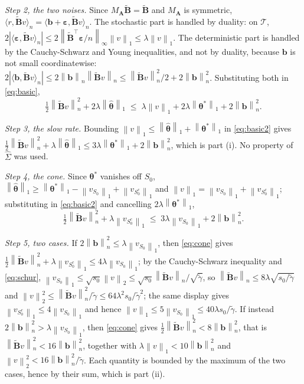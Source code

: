 \documentclass[10pt]{book}
\theoremstyle{definition}
\newcommand{\T}{^{\top}}
\newcommand{\norm}[1]{\left\lVert #1 \right\rVert}
\newcommand{\normn}[1]{\left\lVert #1 \right\rVert_{n}}
\newcommand{\inner}[2]{\langle #1, #2 \rangle}
\newcommand{\btheta}{\boldsymbol{\theta}}
\newcommand{\thetastar}{\btheta^{*}}
\newcommand{\thetahat}{\widehat{\btheta}}
\newcommand{\Gramhat}{\widehat{\Sigma}}
\newcommand{\pen}{\lambda}
\newcommand{\Szero}{S_{0}}
\newcommand{\Amat}{\mathbf{A}}
\newcommand{\Bmat}{\mathbf{B}}
\newcommand{\Btil}{\widetilde{\Bmat}}
\newcommand{\MA}{M_{\Amat}}
\newcommand{\bveps}{\boldsymbol{\varepsilon}}
\newcommand{\bb}{\mathbf{b}}
\newcommand{\gtil}{\widetilde{\gamma}}
\begin{document}
\emph{Step 2, the two noises.} Since $\MA\Btil = \Btil$ and $\MA$ is
symmetric, $\inner{r}{\Btil v}_n = \inner{\bb+\bveps}{\Btil v}_n$. The
stochastic part is handled by duality: on $\mathcal{T}$,
$2|\inner{\bveps}{\Btil v}_n| \le
2\norm{\Btil\T\bveps/n}_{\infty}\norm{v}_1 \le \pen\norm{v}_1$. The
deterministic part is handled by the Cauchy-Schwarz and Young inequalities,
and not by duality, because $\bb$ is not small coordinatewise:
$2|\inner{\bb}{\Btil v}_n| \le 2\normn{\bb}\normn{\Btil v} \le
\normn{\Btil v}^2/2 + 2\normn{\bb}^2$. Substituting both in
\eqref{eq:basic},
\begin{equation}
  \label{eq:basic2}
  \tfrac12\normn{\Btil v}^2 + 2\pen\norm{\thetahat}_1
  \;\le\; \pen\norm{v}_1 + 2\pen\norm{\thetastar}_1 + 2\normn{\bb}^2 .
\end{equation}

\emph{Step 3, the slow rate.} Bounding
$\norm{v}_1 \le \norm{\thetahat}_1+\norm{\thetastar}_1$ in
\eqref{eq:basic2} gives
$\tfrac12\normn{\Btil v}^2 + \pen\norm{\thetahat}_1 \le
3\pen\norm{\thetastar}_1 + 2\normn{\bb}^2$, which is part (i). No property of
$\Gramhat$ was used.

\emph{Step 4, the cone.} Since $\thetastar$ vanishes off $\Szero$,
$\norm{\thetahat}_1 \ge \norm{\thetastar}_1 - \norm{v_{\Szero}}_1 +
\norm{v_{\Szero^c}}_1$ and
$\norm{v}_1 = \norm{v_{\Szero}}_1+\norm{v_{\Szero^c}}_1$; substituting in
\eqref{eq:basic2} and cancelling $2\pen\norm{\thetastar}_1$,
\begin{equation}
  \label{eq:cone}
  \tfrac12\normn{\Btil v}^2 + \pen\norm{v_{\Szero^c}}_1
  \;\le\; 3\pen\norm{v_{\Szero}}_1 + 2\normn{\bb}^2 .
\end{equation}

\emph{Step 5, two cases.} If $2\normn{\bb}^2 \le \pen\norm{v_{\Szero}}_1$,
then \eqref{eq:cone} gives
$\tfrac12\normn{\Btil v}^2 + \pen\norm{v_{\Szero^c}}_1 \le
4\pen\norm{v_{\Szero}}_1$; by the Cauchy-Schwarz inequality and
\eqref{eq:schur}, $\norm{v_{\Szero}}_1 \le \sqrt{s_0}\norm{v}_2 \le
\sqrt{s_0}\normn{\Btil v}/\sqrt{\gtil}$, so
$\normn{\Btil v} \le 8\pen\sqrt{s_0/\gtil}$ and
$\norm{v}_2^2 \le \normn{\Btil v}^2/\gtil \le 64\pen^2s_0/\gtil^2$; the same
display gives $\norm{v_{\Szero^c}}_1 \le 4\norm{v_{\Szero}}_1$ and hence
$\norm{v}_1 \le 5\norm{v_{\Szero}}_1 \le 40\pen s_0/\gtil$. If instead
$2\normn{\bb}^2 > \pen\norm{v_{\Szero}}_1$, then \eqref{eq:cone} gives
$\tfrac12\normn{\Btil v}^2 < 8\normn{\bb}^2$, that is
$\normn{\Btil v}^2 < 16\normn{\bb}^2$, together with
$\pen\norm{v}_1 < 10\normn{\bb}^2$ and
$\norm{v}_2^2 < 16\normn{\bb}^2/\gtil$. Each quantity is bounded by the
maximum of the two cases, hence by their sum, which is part (ii).
\end{document}

